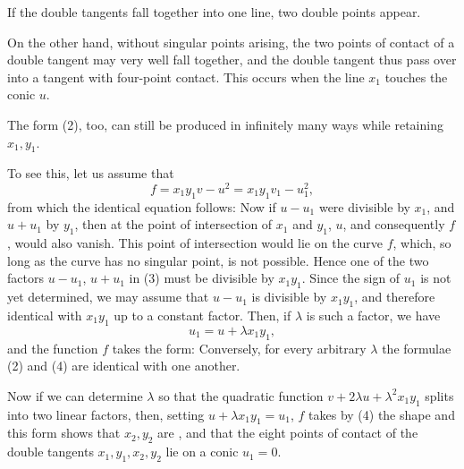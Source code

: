 If the double tangents fall together into one line, two double points appear.

On the other hand, without singular points arising, the two points of contact of a double tangent may very well fall together, and the double tangent thus pass over into a tangent with four-point contact. This occurs when the line $x_1$ touches the conic $u$.

The form (2), too, can still be produced in infinitely many ways while retaining $x_1, y_1$.

To see this, let us assume that
\[
f = x_1 y_1 v - u^2 = x_1 y_1 v_1 - u_1^2,
\]
from which the identical equation follows:
Now if $u - u_1$ were divisible by $x_1$, and $u + u_1$ by $y_1$, then at the point of intersection of $x_1$ and $y_1$, $u$, and consequently $f$, would also vanish. This point of intersection would lie on the curve $f$, which, so long as the curve has no singular point, is not possible. Hence one of the two factors $u - u_1$, $u + u_1$ in (3) must be divisible by $x_1 y_1$. Since the sign of $u_1$ is not yet determined, we may assume that $u - u_1$ is divisible by $x_1 y_1$, and therefore identical with $x_1 y_1$ up to a constant factor. Then, if $\lambda$ is such a factor, we have
\[
u_1 = u + \lambda x_1 y_1,
\]
and the function $f$ takes the form:
Conversely, for every arbitrary $\lambda$ the formulae (2) and (4) are identical with one another.

Now if we can determine $\lambda$ so that the quadratic function $v + 2\lambda u + \lambda^2 x_1 y_1$ splits into two linear factors, then, setting $u + \lambda x_1 y_1 = u_1$, $f$ takes by (4) the shape
and this form shows that $x_2, y_2$ are , and that the eight points of contact of the double tangents $x_1, y_1, x_2, y_2$ lie on a conic $u_1 = 0$.
